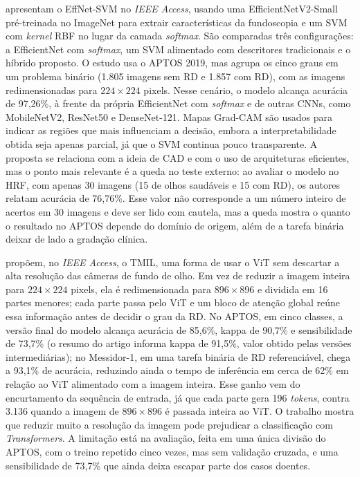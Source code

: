  apresentam o EffNet-SVM no \textit{IEEE Access}, usando uma EfficientNetV2-Small pré-treinada no ImageNet para extrair características da fundoscopia e um SVM com \textit{kernel} RBF no lugar da camada \textit{softmax}. São comparadas três configurações: a EfficientNet com \textit{softmax}, um SVM alimentado com descritores tradicionais e o híbrido proposto. O estudo usa o APTOS 2019, mas agrupa os cinco graus em um problema binário (1.805 imagens sem RD e 1.857 com RD), com as imagens redimensionadas para $224 \times 224$ pixels. Nesse cenário, o modelo alcança acurácia de 97,26\%, à frente da própria EfficientNet com \textit{softmax} e de outras CNNs, como MobileNetV2, ResNet50 e DenseNet-121. Mapas Grad-CAM são usados para indicar as regiões que mais influenciam a decisão, embora a interpretabilidade obtida seja apenas parcial, já que o SVM continua pouco transparente. A proposta se relaciona com a ideia de CAD e com o uso de arquiteturas eficientes, mas o ponto mais relevante é a queda no teste externo: ao avaliar o modelo no HRF, com apenas 30 imagens (15 de olhos saudáveis e 15 com RD), os autores relatam acurácia de 76,76\%. Esse valor não corresponde a um número inteiro de acertos em 30 imagens e deve ser lido com cautela, mas a queda mostra o quanto o resultado no APTOS depende do domínio de origem, além de a tarefa binária deixar de lado a gradação clínica.

 propõem, no \textit{IEEE Access}, o TMIL, uma forma de usar o ViT sem descartar a alta resolução das câmeras de fundo de olho. Em vez de reduzir a imagem inteira para $224 \times 224$ pixels, ela é redimensionada para $896 \times 896$ e dividida em 16 partes menores; cada parte passa pelo ViT e um bloco de atenção global reúne essa informação antes de decidir o grau da RD. No APTOS, em cinco classes, a versão final do modelo alcança acurácia de 85,6\%, kappa de 90,7\% e sensibilidade de 73,7\% (o resumo do artigo informa kappa de 91,5\%, valor obtido pelas versões intermediárias); no Messidor-1, em uma tarefa binária de RD referenciável, chega a 93,1\% de acurácia, reduzindo ainda o tempo de inferência em cerca de 62\% em relação ao ViT alimentado com a imagem inteira. Esse ganho vem do encurtamento da sequência de entrada, já que cada parte gera 196 \textit{tokens}, contra 3.136 quando a imagem de $896 \times 896$ é passada inteira ao ViT. O trabalho mostra que reduzir muito a resolução da imagem pode prejudicar a classificação com \textit{Transformers}. A limitação está na avaliação, feita em uma única divisão do APTOS, com o treino repetido cinco vezes, mas sem validação cruzada, e uma sensibilidade de 73,7\% que ainda deixa escapar parte dos casos doentes.

